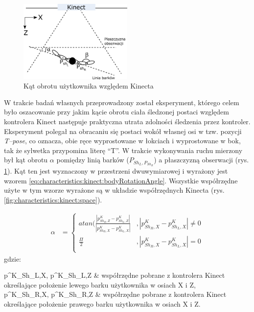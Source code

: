 \begin{figure}[!htb]
	\centering
	\includegraphics[width=0.5\textwidth]{images/kinectAngle.png}
	\caption{Kąt obrotu użytkownika względem Kinecta}
	\label{fig:characteristics:kinect:bodyRotationAngle}
\end{figure}
		
W trakcie badań własnych przeprowadzony został eksperyment, którego celem było oszacowanie przy jakim kącie obrotu ciała śledzonej postaci względem kontrolera Kinect następuje praktyczna utrata zdolności śledzenia przez kontroler. Eksperyment polegał na obracaniu się postaci wokół własnej osi w tzw. pozycji \emph{T--pose}, co oznacza, obie ręce wyprostowane w łokciach i wyprostowane w bok, tak że sylwetka przypomina literę "`T"'. W trakcie wykonywania ruchu mierzony był kąt obrotu $\alpha$ pomiędzy linią barków ($P_{{Sh}_L, P_{{Sh}_R}}$) a płaszczyzną obserwacji (rys. \ref{fig:characteristics:kinect:bodyRotationAngle}). Kąt ten jest wyznaczony w przestrzeni dwuwymiarowej i wyrażony jest wzorem \eqref{eq:characteristics:kinect:bodyRotationAngle}. Wszystkie współrzędne użyte w tym wzorze wyrażone są w układzie współrzędnych Kinecta (rys. \ref{fig:characteristics:kinect:space}).
	
\begin{equation}
	\label{eq:characteristics:kinect:bodyRotationAngle}
	\begin{split}
		\alpha &= 
		\begin{cases} 
			atan(\frac{|p^K_{{Sh}_R,Z} - p^K_{{Sh}_L,Z}|}{|p^K_{{Sh}_R,X} - p^K_{{Sh}_L,X}|} & , |p^K_{{Sh}_R,X} - p^K_{{Sh}_L,X}| \neq 0 \\
			\frac{\Pi}{2}                                                                    & , |p^K_{{Sh}_R,X} - p^K_{{Sh}_L,X}| = 0    \\		
		\end{cases}
	\end{split}
\end{equation}
gdzie:
\begin{conditions}
	p^K_{{Sh}_L,X}, p^K_{{Sh}_L,Z}			& współrzędne pobrane z kontrolera Kinect określające położenie lewego barku użytkownika w osiach X i Z,\\
	p^K_{{Sh}_R,X}, p^K_{{Sh}_R,Z}			& współrzędne pobrane z kontrolera Kinect określające położenie prawego barku użytkownika w osiach X i Z.\\
\end{conditions}
		
